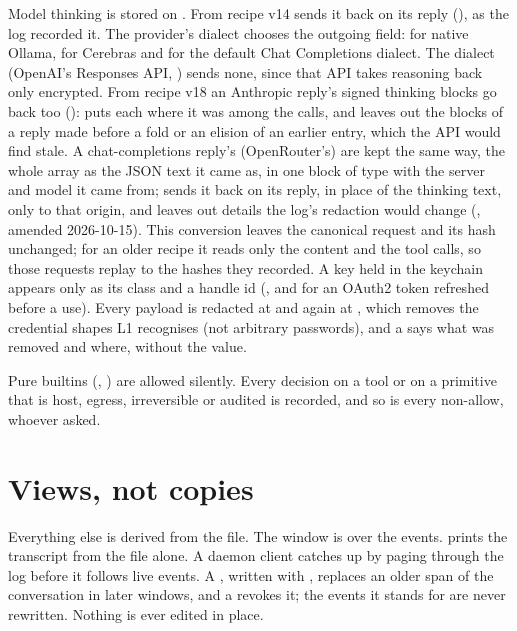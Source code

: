 Model thinking is stored on . From recipe v14
 sends it back on its reply (), as the
log recorded it. The provider's dialect chooses the outgoing field:
 for native Ollama,  for Cerebras and
 for the default Chat Completions dialect. The
 dialect (OpenAI's Responses API, )
sends none, since that API takes reasoning back only encrypted. From recipe
v18 an Anthropic reply's signed thinking blocks go back too
():  puts each where it was among
the calls, and  leaves out the blocks of a reply made before a
fold or an elision of an earlier entry, which the API would find stale.
A chat-completions reply's  (OpenRouter's) are
kept the same way, the whole array as the JSON text it came as, in one block
of type  with the server and model it came from;
 sends it back on its reply, in place of the thinking text,
only to that origin, and  leaves out details the log's redaction
would change (, amended 2026-10-15).
This conversion leaves the canonical request and its hash unchanged;
for an older recipe it reads only the content and the
tool calls, so those requests replay to the hashes they recorded. A key held in the
keychain appears only as its class and a handle id (,
and  for an OAuth2 token refreshed before a use).
Every payload is redacted at  and again at ,
which removes the credential shapes L1 recognises (not arbitrary
passwords), and a  says what was removed and where,
without the value.

Pure builtins (, \code{+}) are allowed silently. Every decision
on a tool or on a primitive that is host, egress, irreversible or audited
is recorded, and so is every non-allow, whoever asked.

\section{Views, not copies}

Everything else is derived from the file. The window is  over
the events.  prints the transcript from the
file alone. A daemon client catches up by paging through the log before
it follows live events. A , written with
, replaces an older span of the conversation in later
windows, and a  revokes it; the events it stands for
are never rewritten. Nothing is ever edited in place.

